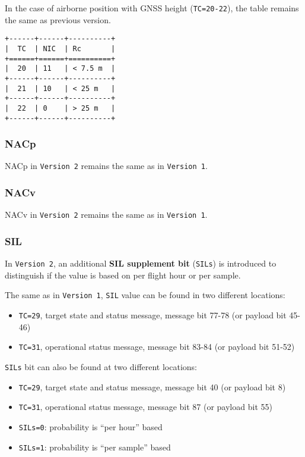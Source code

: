 In the case of airborne position with GNSS height (\texttt{TC=20-22}),
the table remains the same as previous version.

\begin{verbatim}
+------+------+----------+
|  TC  | NIC  | Rc       |
+======+======+==========+
|  20  | 11   | < 7.5 m  |
+------+------+----------+
|  21  | 10   | < 25 m   |
+------+------+----------+
|  22  | 0    | > 25 m   |
+------+------+----------+
\end{verbatim}

\subsubsection{NACp}\label{nacp-1}

NACp in \texttt{Version\ 2} remains the same as in \texttt{Version\ 1}.

\subsubsection{NACv}\label{nacv-1}

NACv in \texttt{Version\ 2} remains the same as in \texttt{Version\ 1}.

\subsubsection{SIL}\label{sil-1}

In \texttt{Version\ 2}, an additional \textbf{SIL supplement bit}
(\texttt{SILs}) is introduced to distinguish if the value is based on
per flight hour or per sample.

The same as in \texttt{Version\ 1}, \texttt{SIL} value can be found in
two different locations:

\begin{itemize}

\item
  \texttt{TC=29}, target state and status message, message bit 77-78 (or
  payload bit 45-46)
\item
  \texttt{TC=31}, operational status message, message bit 83-84 (or
  payload bit 51-52)
\end{itemize}

\texttt{SILs} bit can also be found at two different locations:

\begin{itemize}

\item
  \texttt{TC=29}, target state and status message, message bit 40 (or
  payload bit 8)
\item
  \texttt{TC=31}, operational status message, message bit 87 (or payload
  bit 55)
\item
  \texttt{SILs=0}: probability is ``per hour'' based
\item
  \texttt{SILs=1}: probability is ``per sample'' based
\end{itemize}

